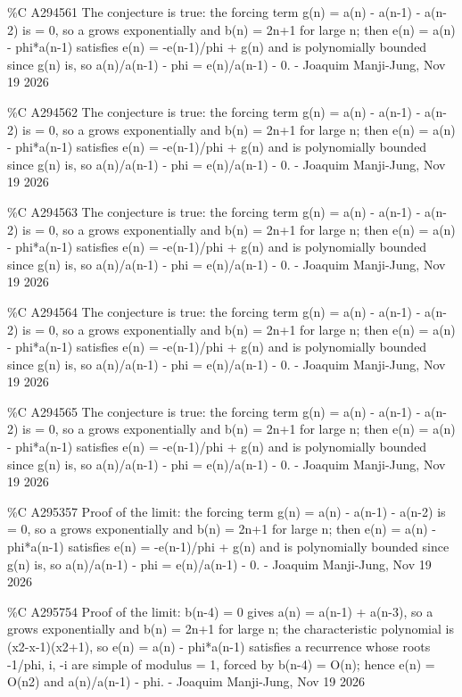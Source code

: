 {\%C A294561 The conjecture is true: the forcing term g(n) = a(n) - a(n-1) - a(n-2) is = 0, so a grows exponentially and b(n) = 2n+1 for large n; then e(n) = a(n) - phi*a(n-1) satisfies e(n) = -e(n-1)/phi + g(n) and is polynomially bounded since g(n) is, so a(n)/a(n-1) - phi = e(n)/a(n-1) - 0. - Joaquim Manji-Jung, Nov 19 2026\par
\%C A294562 The conjecture is true: the forcing term g(n) = a(n) - a(n-1) - a(n-2) is = 0, so a grows exponentially and b(n) = 2n+1 for large n; then e(n) = a(n) - phi*a(n-1) satisfies e(n) = -e(n-1)/phi + g(n) and is polynomially bounded since g(n) is, so a(n)/a(n-1) - phi = e(n)/a(n-1) - 0. - Joaquim Manji-Jung, Nov 19 2026\par
\%C A294563 The conjecture is true: the forcing term g(n) = a(n) - a(n-1) - a(n-2) is = 0, so a grows exponentially and b(n) = 2n+1 for large n; then e(n) = a(n) - phi*a(n-1) satisfies e(n) = -e(n-1)/phi + g(n) and is polynomially bounded since g(n) is, so a(n)/a(n-1) - phi = e(n)/a(n-1) - 0. - Joaquim Manji-Jung, Nov 19 2026\par
\%C A294564 The conjecture is true: the forcing term g(n) = a(n) - a(n-1) - a(n-2) is = 0, so a grows exponentially and b(n) = 2n+1 for large n; then e(n) = a(n) - phi*a(n-1) satisfies e(n) = -e(n-1)/phi + g(n) and is polynomially bounded since g(n) is, so a(n)/a(n-1) - phi = e(n)/a(n-1) - 0. - Joaquim Manji-Jung, Nov 19 2026\par
\%C A294565 The conjecture is true: the forcing term g(n) = a(n) - a(n-1) - a(n-2) is = 0, so a grows exponentially and b(n) = 2n+1 for large n; then e(n) = a(n) - phi*a(n-1) satisfies e(n) = -e(n-1)/phi + g(n) and is polynomially bounded since g(n) is, so a(n)/a(n-1) - phi = e(n)/a(n-1) - 0. - Joaquim Manji-Jung, Nov 19 2026\par
\%C A295357 Proof of the limit: the forcing term g(n) = a(n) - a(n-1) - a(n-2) is = 0, so a grows exponentially and b(n) = 2n+1 for large n; then e(n) = a(n) - phi*a(n-1) satisfies e(n) = -e(n-1)/phi + g(n) and is polynomially bounded since g(n) is, so a(n)/a(n-1) - phi = e(n)/a(n-1) - 0. - Joaquim Manji-Jung, Nov 19 2026\par
\%C A295754 Proof of the limit: b(n-4) = 0 gives a(n) = a(n-1) + a(n-3), so a grows exponentially and b(n) = 2n+1 for large n; the characteristic polynomial is (x2-x-1)(x2+1), so e(n) = a(n) - phi*a(n-1) satisfies a recurrence whose roots -1/phi, i, -i are simple of modulus = 1, forced by b(n-4) = O(n); hence e(n) = O(n2) and a(n)/a(n-1) - phi. - Joaquim Manji-Jung, Nov 19 2026\par
}
